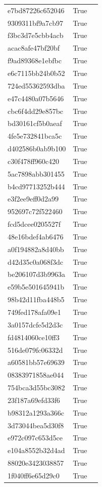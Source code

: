 \begin{tabular}{lrl}
e7bd87226c652046 & True &  \\
9309311bf9a7cb97 & True &  \\
f3bc3d7e5cbb4acb & True &  \\
acac8afe47bf20bf & True &  \\
f9ad89368e1ebfbc & True &  \\
e6c7115bb24b0b52 & True &  \\
724ed55362593dba & True &  \\
e47c4480a07b5646 & True &  \\
cbc6f4dd29e857bc & True &  \\
bd30161cf5b0aeaf & True &  \\
4fe5e732841bca5c & True &  \\
d402586b0ab9b100 & True &  \\
c30f478ff960c420 & True &  \\
5ac7898abb301455 & True &  \\
b4cd97713252b444 & True &  \\
e3f2ee9eff0d2a99 & True &  \\
952697c72f522460 & True &  \\
fcd5dcee0205527f & True &  \\
48e16bdef4ab6476 & True &  \\
a0f194882a8d40bb & True &  \\
d42d35c0a068f3dc & True &  \\
be206107d3b9963a & True &  \\
e59b5e501645941b & True &  \\
98b42d11fba448b5 & True &  \\
749fed178afa09e1 & True &  \\
3a0157dcfe5d2d3c & True &  \\
fd4814060ce10ff3 & True &  \\
516de079fc06332d & True &  \\
a60581bb57e69639 & True &  \\
08383971858ae044 & True &  \\
754bca3d55bc3082 & True &  \\
23f187a69efd33f6 & True &  \\
b98312a1293a366c & True &  \\
3d73044bea5d30f8 & True &  \\
e972c097c653d5ce & True &  \\
e104a8552b32d4ad & True &  \\
88020e3423038857 & True &  \\
1f040ff6e65d29c0 & True &  \\

\end{tabular}
